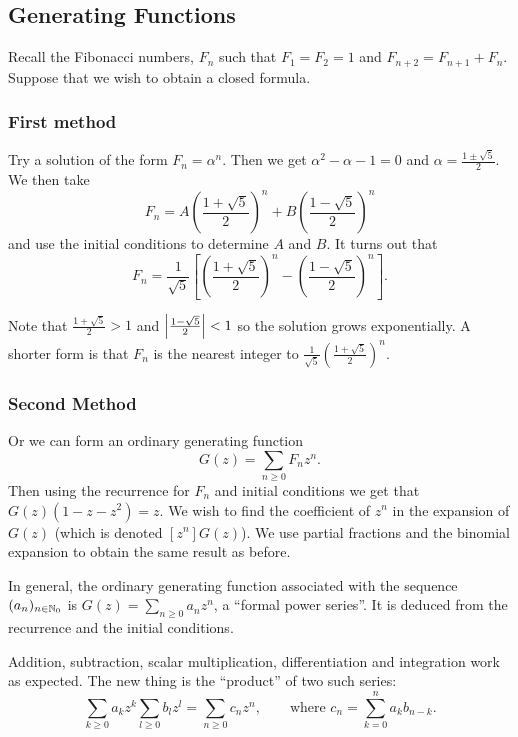 \documentclass{notes}
\theoremstyle{plain}
\begin{document}
\subsection{Generating Functions}

Recall the Fibonacci numbers, $F_n$ such that $F_1 = F_2 = 1$ and
$F_{n+2} = F_{n+1} + F_n$.  Suppose that we wish to obtain a closed
formula.

\subsubsection*{First method}

Try a solution of the form $F_n = \alpha^n$.  Then we get
$\alpha^2 - \alpha - 1 = 0$ and $\alpha = \frac{1 \pm \sqrt{5}}{2}$.  We
then take
\[
F_n = A \left( \frac{1 + \sqrt{5}}{2} \right)^n +
B \left( \frac{1 - \sqrt{5}}{2} \right)^n
\]
and use the initial conditions to determine $A$ and $B$.  It turns out that
\[
F_n = \frac{1}{\sqrt{5}} \left[
\left( \frac{1 + \sqrt{5}}{2} \right)^n -
\left( \frac{1 - \sqrt{5}}{2} \right)^n
\right].
\]

Note that $\frac{1 + \sqrt{5}}{2} > 1$ and $\left|\frac{1 - \sqrt{5}}{2}\right| < 1$
so the solution grows exponentially.  A shorter form is that
$F_n$ is the nearest integer to $\frac{1}{\sqrt{5}}
\left( \frac{1 + \sqrt{5}}{2} \right)^n$.

\subsubsection*{Second Method}

Or we can form an ordinary generating function
\[
G(z) = \sum_{n \ge 0} F_n z^n.
\]
Then using the recurrence for $F_n$ and initial conditions we get
that $G(z) (1 - z - z^2) = z$.  We wish to find the coefficient of $z^n$ in
the expansion of $G(z)$ (which is denoted $[z^n]G(z)$).  We use partial
fractions and the binomial expansion to obtain the same result as before.

In general, the ordinary generating function associated with the sequence
$(a_n)_{n \in \mathbb{N}_0}$ is $G(z) = \sum_{n \ge 0} a_n z^n$, a ``formal
power series''.  It is deduced from the recurrence and the initial
conditions.

Addition, subtraction, scalar multiplication, differentiation and
integration work as expected.  The new thing is the ``product'' of
two such series:
\[
\sum_{k \ge 0} a_k z^k \sum_{l \ge 0} b_l z^l
= \sum_{n \ge 0} c_n z^n, \qquad \text{where }
c_n = \sum_{k=0}^n a_k b_{n-k}.
\]
\end{document}
